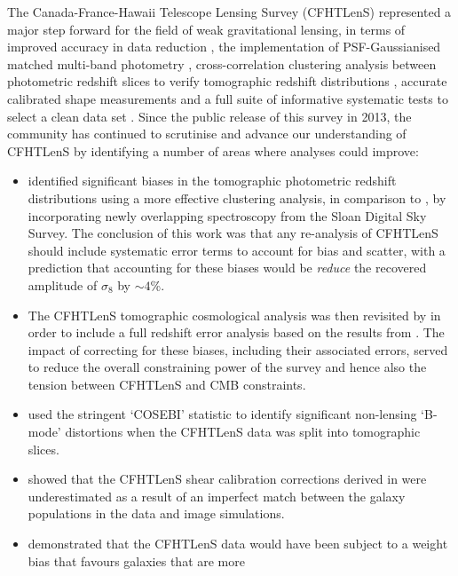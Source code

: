The Canada-France-Hawaii Telescope Lensing Survey (CFHTLenS) represented a
major step forward for the field of weak gravitational lensing, in terms of
improved accuracy in data reduction \citep{CFHTLenS-data}, the implementation
of PSF-Gaussianised matched multi-band photometry
\citep{CFHTLenS-photoz}, cross-correlation clustering analysis between
photometric redshift slices to verify tomographic redshift distributions
\citep{CFHTLenS-2pt-tomo}, accurate calibrated shape measurements
\citep{CFHTLenS-shapes} and a full suite of informative systematic tests to
select a clean data set \citep{CFHTLenS-sys}. Since the public release
of this survey in 2013, the community has continued to scrutinise and advance
our understanding of CFHTLenS by identifying a number of areas where analyses
could improve:
%
\begin{itemize}
%
 \item{\citet{2016MNRAS.463.3737C} identified significant biases in the tomographic
photometric redshift distributions using a more effective clustering analysis,
in comparison to \citet{CFHTLenS-2pt-tomo}, by incorporating newly overlapping
spectroscopy from the Sloan Digital Sky Survey.  The conclusion of this work
was that any re-analysis of CFHTLenS should include systematic error terms to
account for bias and scatter, with a prediction that accounting for these
biases would be {\it reduce} the recovered amplitude of $\sigma_8$ by $\sim
4$\%. }
%
\item{ The CFHTLenS tomographic cosmological analysis was then revisited by
\citet{joudaki/etal:2016} in order to include a full redshift error analysis
based on the results from \citet{2016MNRAS.463.3737C}.  The impact of
correcting for these biases, including their associated errors, served to
reduce the overall constraining power of the survey and hence also the tension
between CFHTLenS and CMB constraints.}
%
 \item{\citet{2016arXiv160100115A} used the stringent `COSEBI' statistic to
identify significant non-lensing `B-mode' distortions when the CFHTLenS data
was split into tomographic slices.}
%
\item{\citet{2015MNRAS.454.3500K} showed that the CFHTLenS shear calibration
corrections derived in \citet{CFHTLenS-shapes} were underestimated as a result
of an imperfect match between the galaxy populations in the data and image
simulations.}
%
\item{\citet{fenechconti/etal:2016} demonstrated that the CFHTLenS data would
have been subject to a weight bias that favours galaxies that are more
}
\end{itemize}
